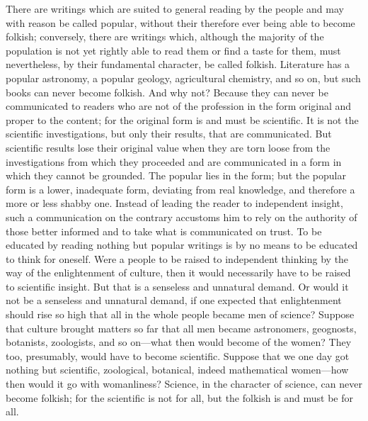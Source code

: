 \documentclass[12pt]{book}
\newcommand{\opage}[1]{\marginnote{\footnotesize\textit{[#1]}}}
\begin{document}
There are writings which are suited to general reading by the people
\opage{120}\setcounter{footnote}{0}%
and may with reason be called popular, without their therefore ever
being able to become folkish; conversely, there are writings which,
although the majority of the population is not yet rightly able to read
them or find a taste for them, must nevertheless, by their fundamental
character, be called folkish. Literature has a popular astronomy, a
popular geology, agricultural chemistry, and so on, but such books can
never become folkish. And why not? Because they can never be
communicated to readers who are not of the profession in the form
original and proper to the content; for the original form is and must
be scientific. It is not the scientific investigations, but only their
results, that are communicated. But scientific results lose their
original value when they are torn loose from the investigations from
which they proceeded and are communicated in a form in which they cannot
be grounded. The popular lies in the form; but the popular form is a
lower, inadequate form, deviating from real knowledge, and therefore a
more or less shabby one. Instead of leading the reader to independent
insight, such a communication on the contrary accustoms him to rely on
the authority of those better informed and to take what is communicated
on trust. To be educated by reading nothing but popular writings is by
no means to be educated to think for oneself. Were a people to be raised
to independent thinking by the way of the enlightenment of culture, then
it would necessarily have to be raised to scientific insight. But that
is a senseless and unnatural demand. Or would it not be a senseless and
unnatural demand, if one expected that enlightenment should rise so high
that all in the whole people became men of science? Suppose that culture
brought matters so far that all men became astronomers, geognosts,
botanists, zoologists, and so on---what then would become of the women?
They too, presumably, would have to become scientific. Suppose that we
\opage{121}\setcounter{footnote}{0}%
one day got nothing but scientific, zoological, botanical, indeed
mathematical women---how then would it go with womanliness? Science, in
the character of science, can never become folkish; for the scientific
is not for all, but the folkish is and must be for all.
\end{document}
